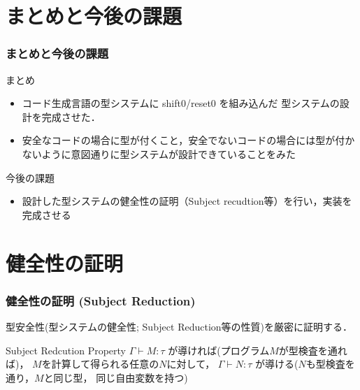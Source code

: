 \documentclass[dvipdfmx,cjk,xcolor=dvipsnames,envcountsect,notheorems,12pt]{beamer}
\theoremstyle{definition}
\begin{document}
\section{まとめと今後の課題}

\begin{frame}
  \frametitle{まとめと今後の課題}
  まとめ
  \begin{itemize}
  \item コード生成言語の型システムに shift0/reset0 を組み込んだ 型システムの設計を完成させた．
  \item 安全なコードの場合に型が付くこと，安全でないコードの場合には型が付かないように意図通りに型システムが設計できていることをみた
  \end{itemize}

  \vspace{\baselineskip}

  今後の課題
  \begin{itemize}
  \item 設計した型システムの健全性の証明（Subject recudtion等）を行い，実装を完成させる
  \end{itemize}
\end{frame}


\begin{appendix}


\end{appendix}

\section{健全性の証明}

\begin{frame}[fragile]
  \frametitle{健全性の証明 (Subject Reduction)}

  型安全性(型システムの健全性; Subject Reduction等の性質)を厳密に証明する．

  \begin{block}{Subject Redcution Property}
    $\Gamma \vdash M: \tau$ が導ければ(プログラム$M$が型検査を通れば)，
    $M$を計算して得られる任意の$N$に対して，
    $\Gamma \vdash N: \tau$ が導ける($N$も型検査を通り，$M$と同じ型，
    同じ自由変数を持つ)
  \end{block}
\end{frame}
\end{document}
